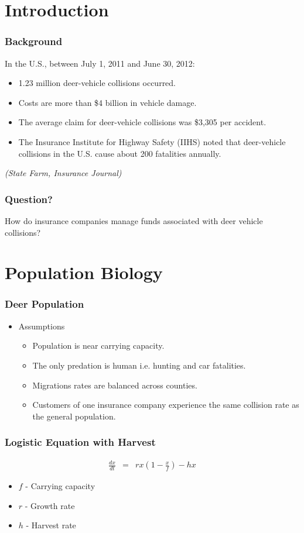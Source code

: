 
\section{Introduction}

\begin{frame}
    \frametitle{Background}
In the U.S., between July 1, 2011 and June 30, 2012:
    \begin{itemize}
    	\item 1.23 million deer-vehicle collisions occurred.
    	\item Costs are more than \$4 billion in vehicle damage.
    	\item The average claim for deer-vehicle collisions was \$3,305 per accident.
    	\item The Insurance Institute for Highway Safety (IIHS) noted that deer-vehicle collisions in the U.S. cause about 200 fatalities annually.
    \end{itemize}
\emph{(State Farm, Insurance Journal)}
\end{frame}


\begin{frame}
    \frametitle{Question?}
How do insurance companies manage funds associated with deer vehicle collisions?
\end{frame}


\section{Population Biology}

\begin{frame}
    \frametitle{Deer Population}
    \begin{itemize}
    	\item Assumptions
		\begin{itemize}
    		\item Population is near carrying capacity.
    		\item The only predation is human i.e. hunting and car fatalities.
    		\item Migrations rates are balanced across counties.
		\item Customers of one insurance company experience the same collision rate as the general population.
    		\end{itemize}
    \end{itemize}
\end{frame}

\begin{frame}
    \frametitle{Logistic Equation with Harvest}
	\vspace{-1cm}
	\begin{eqnarray*}
		\frac{dx}{dt} &=& rx \left( 1-\frac{x}{f} \right) -hx
	\end{eqnarray*}
	\begin{itemize}
		\item $f$ - Carrying capacity
		\item $r$ - Growth rate
		\item $h$ - Harvest rate
	\end{itemize}
\end{frame}

